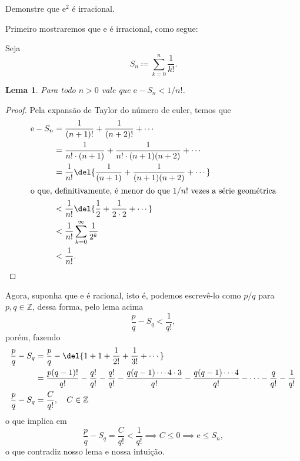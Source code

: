 \documentclass{IMTexam}
\author{Isabella B. Amaral}
\date{20 de junho}
\newtheorem{lemma}[theorem]{Lema}
\begin{document}
    \maketitle

    \begin{questions}
        \question Demonstre que $\mathrm{e}^2$ é irracional.

        \begin{solution}
            Primeiro mostraremos que $\mathrm{e}$ é irracional, como segue:

            Seja
            \[S_n\coloneq\sum_{k=0}^n\dfrac{1}{k!}.\]
            \begin{lemma}
                Para todo $n>0$ vale que $\mathrm{e}-S_n<1/n!$.
            \end{lemma}
            \begin{proof}
                Pela expansão de Taylor do número de euler, temos que
                \begin{align*}
                    \mathrm{e}-S_n&=\dfrac{1}{(n+1)!}+\dfrac{1}{(n+2)!}+\cdots\\
                    &=\dfrac{1}{n!\cdot(n+1)}+\dfrac{1}{n!\cdot(n+1)(n+2)}+\cdots\\
                    &=\dfrac{1}{n!}\del{\dfrac{1}{(n+1)}+\dfrac{1}{(n+1)(n+2)}+\cdots}\\
                    \intertext{o que, definitivamente, é menor do que $1/n!$ vezes a série geométrica}
                    &<\dfrac{1}{n!}\del{\dfrac{1}{2}+\dfrac{1}{2\cdot 2}+\cdots}\\
                    &<\dfrac{1}{n!}\sum_{k=0}^\infty\dfrac{1}{2^k}\\
                    &<\dfrac{1}{n!}.
                \end{align*}
            \end{proof}

            Agora, suponha que $\mathrm{e}$ é racional, isto é, podemos escrevê-lo como $p/q$ para
            $p,q\in\mathbb{Z}$, dessa forma, pelo lema acima
            \[ \dfrac{p}{q}-S_q<\dfrac{1}{q!}, \]
            porém, fazendo
            \begin{align*}
                \dfrac{p}{q}-S_q&=\dfrac{p}{q}-\del{1+1+\dfrac{1}{2!}+\dfrac{1}{3!}+\cdots}\\
                &=\dfrac{p(q-1)!}{q!}-\dfrac{q!}{q!}-\dfrac{q!}{q!}-\dfrac{q(q-1)\cdots4\cdot3}{q!}-\dfrac{q(q-1)\cdots4}{q!}-\cdots-\dfrac{q}{q!}-\dfrac{1}{q!}\\
                \dfrac{p}{q}-S_q&=\dfrac{C}{q!},\quad C\in\mathbb{Z}
            \end{align*}
            o que implica em
            \[\dfrac{p}{q}-S_q=\dfrac{C}{q!}<\dfrac{1}{q!}\implies C\leqslant 0 \implies \mathrm{e}\leqslant S_n, \]
            o que contradiz nosso lema e nossa intuição.


\end{solution}
\end{questions}
\end{document}

